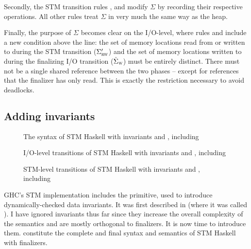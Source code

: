 Secondly, the STM transition rules ,  and  modify $\Sigma$ by recording their respective operations.
All other rules treat $\Sigma$ in very much the same way as the heap.

Finally, the purpose of $\Sigma$ becomes clear on the I/O-level, where rules  and  include a new condition above the line:
the set of memory locations read from or written to during the STM transition ($\Sigma'_\textsc{rw}$) and the set of memory locations written to during the finalizing I/O transition ($\hat{\Sigma}_\textsc{w}$) must be entirely distinct.
There must not be a single shared reference between the two phases -- except for references that the finalizer has only read.
This is exactly the restriction necessary to avoid deadlocks.


\subsection{Adding invariants}

\begin{figure}

\caption{The syntax of STM Haskell with invariants and , including }
\label{fig:final-syntax}
\end{figure}

\begin{figure}

\caption{I/O-level transitions of STM Haskell with invariants and , including }
\label{fig:final-io}
\end{figure}


\begin{figure}

\caption{STM-level transitions of STM Haskell with invariants and , including }
\label{fig:final-stm}
\end{figure}

GHC's STM implementation includes the  primitive, used to introduce dynamically-checked data invariants.
It was first described in \textcite{harris-peytonjones-2006} (where it was called ).
I have ignored invariants thus far since they increase the overall complexity of the semantics and are mostly orthogonal to finalizers.
It is now time to introduce them.
 constitute the complete and final syntax and semantics of STM Haskell with finalizers.

